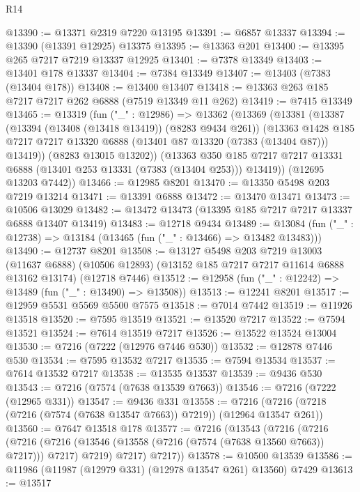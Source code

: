 \begin{lexlean}{R14}
\begin{coremodule}
@13390 := @13371 @2319 @7220 @13195
@13391 := @6857 @13337
@13394 := @13390 (@13391 @12925) @13375
@13395 := @13363 @201
@13400 := @13395 @265 @7217 @7219 @13337 @12925
@13401 := @7378 @13349
@13403 := @13401 @178 @13337
@13404 := @7384 @13349
@13407 := @13403 (@7383 (@13404 @178))
@13408 := @13400 @13407
@13418 := @13363 @263 @185 @7217 @7217 @262 @6888 (@7519 @13349 @11 @262)
@13419 := @7415 @13349
@13465 := @13319
    (fun ("_" : @12986) =>
    @13362
      (@13369
        (@13381
          (@13387
            (@13394 (@13408 (@13418 @13419)) (@8283 @9434 @261))
            (@13363
              @1428
              @185
              @7217
              @7217
              @13320
              @6888
              (@13401 @87 @13320 (@7383 (@13404 @87)))
              @13419))
          (@8283 @13015 @13202))
        (@13363
          @350
          @185
          @7217
          @7217
          @13331
          @6888
          (@13401 @253 @13331 (@7383 (@13404 @253)))
          @13419))
      (@12695 @13203 @7442))
@13466 := @12985 @8201
@13470 := @13350 @5498 @203 @7219 @13214
@13471 := @13391 @6888
@13472 := @13470 @13471
@13473 := @10506 @13029
@13482 := @13472 @13473 (@13395 @185 @7217 @7217 @13337 @6888 @13407 @13419)
@13483 := @12718 @9434
@13489 := @13084 (fun ("_" : @12738) => @13184 (@13465 (fun ("_" : @13466) => @13482 @13483)))
@13490 := @12737 @8201
@13508 := @13127
    @5498
    @203
    @7219
    @13003
    (@11637 @6888)
    (@10506 @12893)
    (@13152 @185 @7217 @7217 @11614 @6888 @13162 @13174)
    (@12718 @7446)
@13512 := @12958 (fun ("_" : @12242) => @13489 (fun ("_" : @13490) => @13508))
@13513 := @12241 @8201
@13517 := @12959 @5531 @5569 @5500 @7575
@13518 := @7014 @7442
@13519 := @11926 @13518
@13520 := @7595 @13519
@13521 := @13520 @7217
@13522 := @7594 @13521
@13524 := @7614 @13519 @7217
@13526 := @13522 @13524 @13004
@13530 := @7216 (@7222 (@12976 @7446 @530))
@13532 := @12878 @7446 @530
@13534 := @7595 @13532 @7217
@13535 := @7594 @13534
@13537 := @7614 @13532 @7217
@13538 := @13535 @13537
@13539 := @9436 @530
@13543 := @7216 (@7574 (@7638 @13539 @7663))
@13546 := @7216 (@7222 (@12965 @331))
@13547 := @9436 @331
@13558 := @7216 (@7216 (@7218 (@7216 (@7574 (@7638 @13547 @7663)) @7219)) (@12964 @13547 @261))
@13560 := @7647 @13518 @178
@13577 := @7216
    (@13543
      (@7216
        (@7216
          (@7216 (@7216 (@13546 (@13558 (@7216 (@7574 (@7638 @13560 @7663)) @7217))) @7217) @7219)
          @7217)
        @7217))
@13578 := @10500 @13539
@13586 := @11986 (@11987 (@12979 @331) (@12978 @13547 @261) @13560) @7429
@13613 := @13517

\end{coremodule}
\end{lexlean}
